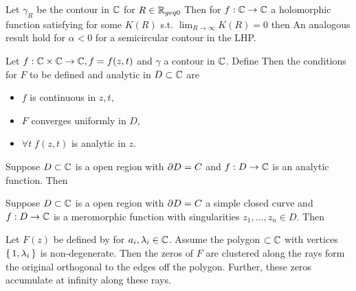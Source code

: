 \documentclass{article}
\begin{document}
\begin{lemma}\label{lemma:BVP:JordansLemma}
Let $\gamma_R$ be the contour in $\mathbb{C}$ for $R\in\mathbb{R}_{geq 0}$
Then for $f:\mathbb{C}\to\mathbb{C}$ a holomorphic function satisfying 
for some $K(R)$ s.t. $\lim_{R\to\infty} K(R) = 0$ then 
An analogous result hold for $\alpha <0$ for a semicircular contour in the LHP. 
\end{lemma}

\begin{theorem}\label{thm:BVP:AnalyticIntegral}
Let $f : \mathbb{C} \times \mathbb{C} \to \mathbb{C}, f=f(z,t)$ and $\gamma$ a contour in $\mathbb{C}$. Define
Then the conditions for $F$ to be defined and analytic in $D \subset \mathbb{C}$ are 
\begin{itemize}
    \item $f$ is continuous in $z,t$,
    \item $F$ converges uniformly in $D$,
    \item $\forall t \; f(z,t)$ is analytic in $z$. 
\end{itemize}
\end{theorem}

\begin{theorem}\label{thm:BVP:Cauchy}
Suppose $D\subset\mathbb{C}$ is a open region with  $\partial D = C$ and $f:D \to \mathbb{C}$ is an analytic function. Then 
\end{theorem}

\begin{theorem}
Suppose $D\subset\mathbb{C}$ is a open region with  $\partial D = C$ a simple closed curve and $f:D \to \mathbb{C}$ is a meromorphic function with singularities $z_1, \dots, z_n \in D$. Then 
\end{theorem}

\begin{theorem}\label{thm:BVPs:AccumulatingZeros}
Let $F(z)$ be defined by 
for $a_i, \lambda_i \in \mathbb{C}$. Assume the polygon $\subset \mathbb{C}$ with vertices $\set{1,\lambda_i}$ is non-degenerate. Then the zeros of $F$ are clustered along the rays form the original orthogonal to the edges off the polygon. Further, these zeros accumulate at infinity along these rays. 
\end{theorem}
\end{document}
